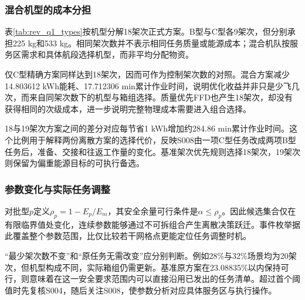 \subsubsection{混合机型的成本分担}
表\ref{tab:rev_q1_types}按机型分解18架次正式方案。B型与C型各9架次，但分别承担225 kg和533 kg。相同架次数并不表示相同任务质量或能源成本；混合机队按服务区需求和具体航段选择机型，而非平均分配物资。


仅C型精确方案同样达到18架次，因而可作为控制架次数的对照。混合方案减少14.803612 kWh能耗、17.712306 min累计作业时间，说明优化收益并非只是少飞几次，而来自同架次数下的机型与箱组选择。质量优先FFD也产生18架次，却没有获得相同的次级成本，进一步说明完整物理成本需要进入组合选择。

18与19架次方案之间的差分对应每节省1 kWh增加约284.86 min累计作业时间。这个比例用于解释两份离散方案的选择代价，反映S008由一项C型任务改成两项B型任务后，准备、交接和往返工作量的变化。基准架次优先规则选择18架次，19架次则保留为偏重能源目标的可执行备选。

\subsubsection{参数变化与实际任务调整}
对批型$p$定义$\rho_p=1-E_p/E_m$，其安全余量可行条件是$\alpha\le\rho_p$。因此候选集合仅在有限临界值处变化，连续参数能够通过不可拆组合产生离散决策跃迁。事件枚举据此覆盖整个参数范围，比仅比较若干网格点更能定位任务调整时机。

“最少架次数不变”和“原任务无需改变”应分别判断。例如28\%与32\%场景均为20架次，但机型构成不同，实际箱组仍需更新。基准原方案在23.08835\%以内保持可行，则意味着在这一安全要求范围内可以直接沿用已发出的任务清单。超过首个阈值时先复核S004，随后关注S008，使参数分析对应具体服务区与执行操作。
